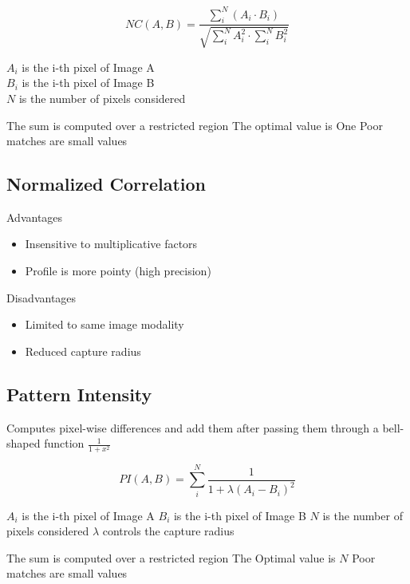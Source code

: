 \begin{equation}
NC(A,B) = \frac{ \sum_i^N \left( A_i \cdot B_i \right) }
         { \sqrt { \sum_i^N A_i^2  \cdot \sum_i^N B_i^2 } }
\end{equation}


\begin{center}
$A_i$ is the i-th pixel of Image A\\ 
$B_i$ is the i-th pixel of Image B\\
$N$ is the number of pixels considered
\end{center}

The sum is computed over a restricted region
The optimal value is  One
Poor matches are small values 


\subsection{Normalized Correlation}


Advantages

\begin{itemize}
\item Insensitive to multiplicative factors
\item Profile is more pointy (high precision)
\end{itemize}

Disadvantages
\begin{itemize}
\item Limited to same image modality
\item Reduced capture radius
\end{itemize}


\subsection{Pattern Intensity}

Computes pixel-wise differences and add them after passing them through a
bell-shaped function $\frac{1}{1+x^2}$

\begin{equation}
PI(A,B) =  \sum_i^N \frac{ 1 }{ 1 + \lambda \left( A_i - B_i \right) ^ 2 }
\end{equation}

\begin{center}
$A_i$ is the i-th pixel of Image A 
$B_i$ is the i-th pixel of Image B
$N$ is the number of pixels considered
$\lambda$ controls the capture radius
\end{center}

The sum is computed over a restricted region
The  Optimal value is $N$
Poor matches are small values 


